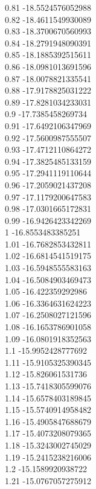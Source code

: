 {0.81	-18.5524576052988\\
0.82	-18.4611549930089\\
0.83	-18.3700670560993\\
0.84	-18.2791948090391\\
0.85	-18.1885392515611\\
0.86	-18.0981013691596\\
0.87	-18.0078821335541\\
0.88	-17.9178825031222\\
0.89	-17.8281034233031\\
0.9	-17.7385458269734\\
0.91	-17.6492106347969\\
0.92	-17.5600987555507\\
0.93	-17.4712110864272\\
0.94	-17.3825485133159\\
0.95	-17.2941119110644\\
0.96	-17.2059021437208\\
0.97	-17.1179200647583\\
0.98	-17.0301665172831\\
0.99	-16.9426423342269\\
1	-16.8553483385251\\
1.01	-16.7682853432811\\
1.02	-16.6814541519175\\
1.03	-16.5948555583163\\
1.04	-16.5084903469473\\
1.05	-16.422359292986\\
1.06	-16.3364631624223\\
1.07	-16.2508027121596\\
1.08	-16.1653786901058\\
1.09	-16.0801918352563\\
1.1	-15.9952428777692\\
1.11	-15.9105325390345\\
1.12	-15.826061531736\\
1.13	-15.7418305599076\\
1.14	-15.6578403189845\\
1.15	-15.5740914958482\\
1.16	-15.4905847688679\\
1.17	-15.4073208079365\\
1.18	-15.3243002745029\\
1.19	-15.2415238216006\\
1.2	-15.1589920938722\\
1.21	-15.0767057275912\\
}
